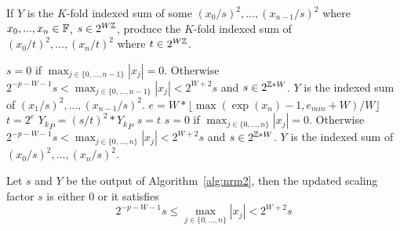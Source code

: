    \begin{samepage}
    \begin{alg}
      If $Y$ is the $K$-fold indexed sum of some $(x_0/s)^2, ..., (x_{n - 1}/s)^2$ where $x_0, ..., x_{n} \in \mathbb{F}$, $s \in 2^{W\mathbb{Z}}$, produce the $K$-fold indexed sum of $(x_0/t)^2, ..., (x_{n}/t)^2$ where $t \in 2^{W\mathbb{Z}}$. 
      \begin{algorithmic}[1]
        \Require
        \Statex $s=0$ if $\max_{j \in \{0, ..., n - 1\}}|x_j| = 0$.
        Otherwise $2^{-p-W-1} s < \max_{j \in \{0, ..., n - 1\}}|x_j| < 2^{W+2} s$
        and $s \in 2^{\mathbb{Z}*W}$.
        \Statex $Y$ is the indexed sum of $(x_1/s)^2, ..., (x_{n-1}/s)^2$.
          \State $e = W * \lfloor\max(\exp(x_n) - 1,e_{min}+W) / W\rfloor$
              \label{alg:nrm2.line.e}
          \State $t = 2^e$
                  \State ${Y_k}_P = (s/t)^2 * {Y_k}_P$
              \EndFor
              \State $s = t$
          \EndIf
        \State {}
      \EndFunction
      \Ensure
      \Statex $s=0$ if $\max_{j \in \{0, ..., n\}}|x_j| = 0$.
      Otherwise $2^{-p-W-1} s < \max_{j \in \{0, ..., n\}}|x_j| < 2^{W+2} s$
      and $s \in 2^{\mathbb{Z}*W}$.
      \Statex $Y$ is the indexed sum of $(x_0/s)^2, ..., (x_{n}/s)^2$.
      \end{algorithmic}
      \label{alg:nrm2}
    \end{alg}
    \end{samepage}

    \begin{lem}
    \label{lem:nrm2_scaling}
    Let $s$ and $Y$ be the output of Algorithm~\ref{alg:nrm2}, then the updated scaling factor $s$ is either $0$ or it satisfies
    \begin{equation}
        2^{-p-W-1}s \leq \max_{j \in \{0, ..., n\}}|x_j| < 2^{W+2} s
    \end{equation}
    \end{lem}


